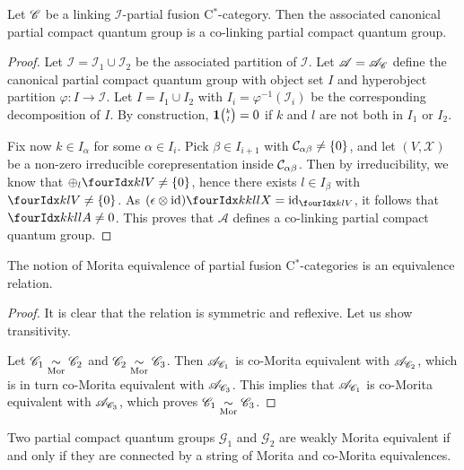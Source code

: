 
\begin{Prop}\label{PropCoLink} Let $\mathscr{C}$ be a linking $\mathscr{I}$-partial fusion C$^*$-category. Then the associated canonical partial compact quantum group is a co-linking partial compact quantum group. 
\end{Prop} 

\begin{proof} Let $\mathscr{I}= \mathscr{I}_1\cup \mathscr{I}_2$ be the associated partition of $\mathscr{I}$. Let $\mathscr{A} = \mathscr{A}_{\mathscr{C}}$ define the canonical partial compact quantum group with object set $I$ and hyperobject partition $\varphi:I\rightarrow \mathscr{I}$. Let $I=I_1\cup I_2$ with $I_i = \varphi^{-1}(\mathscr{I}_i)$ be the corresponding decomposition of $I$. By construction, $\mathbf{1}{\tiny {\begin{pmatrix} k\\l\end{pmatrix}}}=0$ if $k$ and $l$ are not both in $I_1$ or $I_2$. 

Fix now $k\in I_{\alpha}$ for some $\alpha \in I_i$. Pick $\beta\in I_{i+1}$ with $\mathcal{C}_{\alpha\beta}\neq\{0\}$, and let $(V,\mathscr{X})$ be a non-zero irreducible corepresentation inside $\mathcal{C}_{\alpha\beta}$. Then by irreducibility, we know that $\oplus_l \Gru{V}{k}{l} \neq \{0\}$, hence there exists $l\in I_{\beta}$ with $\Gru{V}{k}{l}\neq \{0\}$. As $(\epsilon\otimes \id)\Gr{X}{k}{l}{k}{l} = \id_{\Gru{V}{k}{l}}$, it follows that $\Gr{A}{k}{l}{k}{l} \neq 0$. This proves that $\mathscr{A}$ defines a co-linking partial compact quantum group.
\end{proof} 

\begin{Cor} The notion of Morita equivalence of partial fusion C$^*$-categories is an equivalence relation.
\end{Cor} 
\begin{proof}  It is clear that the relation is symmetric and reflexive. Let us show transitivity.

Let $\mathscr{C}_1\underset{\textrm{Mor}}{\sim} \mathscr{C}_2$ and $\mathscr{C}_2\underset{\textrm{Mor}}{\sim} \mathscr{C}_3$. Then $\mathscr{A}_{\mathscr{C}_1}$ is co-Morita equivalent with  $\mathscr{A}_{\mathscr{C}_2}$, which is in turn co-Morita equivalent with $\mathscr{A}_{\mathscr{C}_3}$. This implies that $\mathscr{A}_{\mathscr{C}_1}$ is co-Morita equivalent with $\mathscr{A}_{\mathscr{C}_3}$, which proves $\mathscr{C}_1\underset{\textrm{Mor}}{\sim} \mathscr{C}_3$.
\end{proof} 

\begin{Theorem} Two partial compact quantum groups $\mathscr{G}_1$ and $\mathscr{G}_2$ are weakly Morita equivalent if and only if they are connected by a string of Morita and co-Morita equivalences. 
\end{Theorem}

